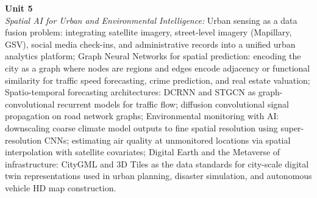 \noindent\textbf{Unit 5} \\
\textit{Spatial AI for Urban and Environmental Intelligence:} Urban sensing as a data fusion problem: integrating satellite imagery, street-level imagery (Mapillary, GSV), social media check-ins, and administrative records into a unified urban analytics platform; Graph Neural Networks for spatial prediction: encoding the city as a graph where nodes are regions and edges encode adjacency or functional similarity for traffic speed forecasting, crime prediction, and real estate valuation; Spatio-temporal forecasting architectures: DCRNN and STGCN as graph-convolutional recurrent models for traffic flow; diffusion convolutional signal propagation on road network graphs; Environmental monitoring with AI: downscaling coarse climate model outputs to fine spatial resolution using super-resolution CNNs; estimating air quality at unmonitored locations via spatial interpolation with satellite covariates; Digital Earth and the Metaverse of infrastructure: CityGML and 3D Tiles as the data standards for city-scale digital twin representations used in urban planning, disaster simulation, and autonomous vehicle HD map construction.

\newpage
{}